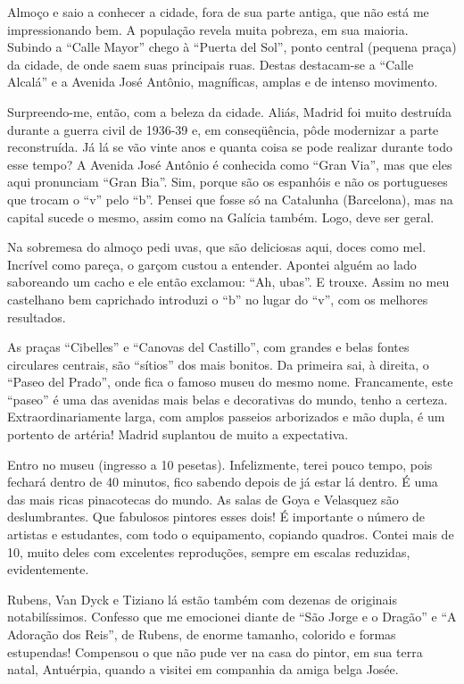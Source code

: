 Almoço e saio a conhecer a cidade, fora de sua parte antiga, que não está me impressionando bem. A população revela muita pobreza, em sua maioria. Subindo a ``Calle Mayor'' chego à ``Puerta del Sol'', ponto central (pequena praça) da cidade, de onde saem suas principais ruas. Destas destacam-se a ``Calle Alcalá'' e a Avenida José Antônio, magníficas, amplas e de intenso movimento.

Surpreendo-me, então, com a beleza da cidade. Aliás, Madrid foi muito destruída durante a guerra civil de 1936-39 e, em conseqüência, pôde modernizar a parte reconstruída. Já lá se vão vinte anos e quanta coisa se pode realizar durante todo esse tempo? A Avenida José Antônio é conhecida como ``Gran Via'', mas que eles aqui pronunciam ``Gran Bia''. Sim, porque são os espanhóis e não os portugueses que trocam o ``v'' pelo ``b''. Pensei que fosse só na Catalunha (Barcelona), mas na capital sucede o mesmo, assim como na Galícia também. Logo, deve ser geral.

Na sobremesa do almoço pedi uvas, que são deliciosas aqui, doces como mel. Incrível como pareça, o garçom custou a entender. Apontei alguém ao lado saboreando um cacho e ele então exclamou: ``Ah, ubas''. E trouxe. Assim no meu castelhano bem caprichado introduzi o ``b'' no lugar do ``v'', com os melhores resultados.

As praças ``Cibelles'' e ``Canovas del Castillo'', com grandes e belas fontes circulares centrais, são ``sítios'' dos mais bonitos. Da primeira sai, à direita, o ``Paseo del Prado'', onde fica o famoso museu do mesmo nome. Francamente, este ``paseo'' é uma das avenidas mais belas e decorativas do mundo, tenho a certeza. Extraordinariamente larga, com amplos passeios arborizados e mão dupla, é um portento de artéria! Madrid suplantou de muito a expectativa.

Entro no museu (ingresso a 10 pesetas). Infelizmente, terei pouco tempo, pois fechará dentro de 40 minutos, fico sabendo depois de já estar lá dentro. É uma das mais ricas pinacotecas do mundo. As salas de Goya e Velasquez são deslumbrantes. Que fabulosos pintores esses dois! É importante o número de artistas e estudantes, com todo o equipamento, copiando quadros. Contei mais de 10, muito deles com excelentes reproduções, sempre em escalas reduzidas, evidentemente.

Rubens, Van Dyck e Tiziano lá estão também com dezenas de originais notabilíssimos. Confesso que me emocionei diante de ``São Jorge e o Dragão'' e ``A Adoração dos Reis'', de Rubens, de enorme tamanho, colorido e formas estupendas! Compensou o que não pude ver na casa do pintor, em sua terra natal, Antuérpia, quando a visitei em companhia da amiga belga Josée.

